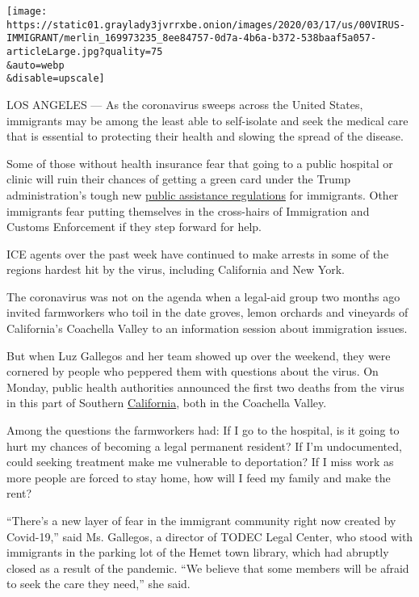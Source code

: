 \texttt{[image: https://static01.graylady3jvrrxbe.onion/images/2020/03/17/us/00VIRUS-IMMIGRANT/merlin\_169973235\_8ee84757-0d7a-4b6a-b372-538baaf5a057-articleLarge.jpg?quality=75\\\&auto=webp\\\&disable=upscale]}

LOS ANGELES --- As the coronavirus sweeps across the United States,
immigrants may be among the least able to self-isolate and seek the
medical care that is essential to protecting their health and slowing
the spread of the disease.

Some of those without health insurance fear that going to a public
hospital or clinic will ruin their chances of getting a green card under
the Trump administration's tough new
\href{https://www.nytimes3xbfgragh.onion/2020/01/27/us/supreme-court-trump-green-cards.html}{public
assistance regulations} for immigrants. Other immigrants fear putting
themselves in the cross-hairs of Immigration and Customs Enforcement if
they step forward for help.

ICE agents over the past week have continued to make arrests in some of
the regions hardest hit by the virus, including California and New York.

The coronavirus was not on the agenda when a legal-aid group two months
ago invited farmworkers who toil in the date groves, lemon orchards and
vineyards of California's Coachella Valley to an information session
about immigration issues.

But when Luz Gallegos and her team showed up over the weekend, they were
cornered by people who peppered them with questions about the virus. On
Monday, public health authorities announced the first two deaths from
the virus in this part of Southern
\href{https://www.nytimes3xbfgragh.onion/article/california-coronavirus.html}{California},
both in the Coachella Valley.

Among the questions the farmworkers had: If I go to the hospital, is it
going to hurt my chances of becoming a legal permanent resident? If I'm
undocumented, could seeking treatment make me vulnerable to deportation?
If I miss work as more people are forced to stay home, how will I feed
my family and make the rent?

``There's a new layer of fear in the immigrant community right now
created by Covid-19,'' said Ms. Gallegos, a director of TODEC Legal
Center, who stood with immigrants in the parking lot of the Hemet town
library, which had abruptly closed as a result of the pandemic. ``We
believe that some members will be afraid to seek the care they need,''
she said.

